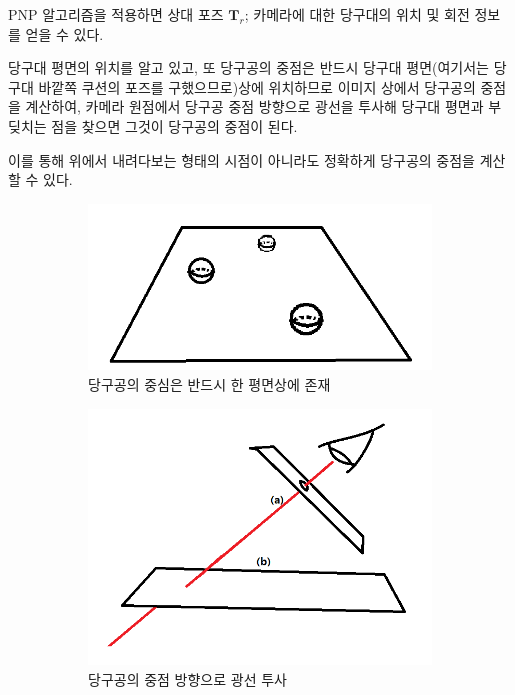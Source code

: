 \documentclass[10pt]{oblivoir}
\begin{document}
PNP 알고리즘을 적용하면 상대 포즈 $\textbf{T}_{r}$; 카메라에 대한 당구대의 위치 및 회전 정보를 얻을 수 있다.

당구대 평면의 위치를 알고 있고, 또 당구공의 중점은 반드시 당구대 평면(여기서는 당구대 바깥쪽 쿠션의 포즈를 구했으므로)상에 위치하므로 이미지 상에서 당구공의 중점을 계산하여, 카메라 원점에서 당구공 중점 방향으로 광선을 투사해 당구대 평면과 부딪치는 점을 찾으면 그것이 당구공의 중점이 된다.

이를 통해 위에서 내려다보는 형태의 시점이 아니라도 정확하게 당구공의 중점을 계산할 수 있다.

\begin{figure}
    \centering
    \begin{subfigure}{0.4\textwidth}
        \includegraphics[width = \textwidth]{img/ball-recognition-introduce.png}
        \caption{당구공의 중심은 반드시 한 평면상에 존재}
    \end{subfigure}
    \begin{subfigure}{0.4\textwidth}
        \includegraphics[width=\textwidth]{img/ball-recognition-howto.png}
        \caption{당구공의 중점 방향으로 광선 투사}
        \label{fig;raycast-to-table}
    \end{subfigure}
    \caption{}
\end{figure}
\end{document}
